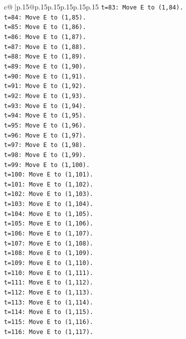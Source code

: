 \documentclass{article}
\begin{document}
{\begin{supertabular}{c@{$\;$}|p{.15\linewidth}@{}p{.15\linewidth}p{.15\linewidth}p{.15\linewidth}p{.15\linewidth}p{.15\linewidth}}
{{{\texttt{t=83: Move E to (1,84).} \\
\texttt{t=84: Move E to (1,85).} \\
\texttt{t=85: Move E to (1,86).} \\
\texttt{t=86: Move E to (1,87).} \\
\texttt{t=87: Move E to (1,88).} \\
\texttt{t=88: Move E to (1,89).} \\
\texttt{t=89: Move E to (1,90).} \\
\texttt{t=90: Move E to (1,91).} \\
\texttt{t=91: Move E to (1,92).} \\
\texttt{t=92: Move E to (1,93).} \\
\texttt{t=93: Move E to (1,94).} \\
\texttt{t=94: Move E to (1,95).} \\
\texttt{t=95: Move E to (1,96).} \\
\texttt{t=96: Move E to (1,97).} \\
\texttt{t=97: Move E to (1,98).} \\
\texttt{t=98: Move E to (1,99).} \\
\texttt{t=99: Move E to (1,100).} \\
\texttt{t=100: Move E to (1,101).} \\
\texttt{t=101: Move E to (1,102).} \\
\texttt{t=102: Move E to (1,103).} \\
\texttt{t=103: Move E to (1,104).} \\
\texttt{t=104: Move E to (1,105).} \\
\texttt{t=105: Move E to (1,106).} \\
\texttt{t=106: Move E to (1,107).} \\
\texttt{t=107: Move E to (1,108).} \\
\texttt{t=108: Move E to (1,109).} \\
\texttt{t=109: Move E to (1,110).} \\
\texttt{t=110: Move E to (1,111).} \\
\texttt{t=111: Move E to (1,112).} \\
\texttt{t=112: Move E to (1,113).} \\
\texttt{t=113: Move E to (1,114).} \\
\texttt{t=114: Move E to (1,115).} \\
\texttt{t=115: Move E to (1,116).} \\
\texttt{t=116: Move E to (1,117).} \\
}}}
\end{supertabular}}
\end{document}
